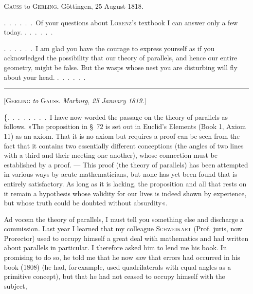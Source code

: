 \clearpage{}
\begin{center}\textsc{Gauss} to \textsc{Gerling}. Göttingen, 25 August 1818.\end{center}

.\ .\ .\ .\ .\ .\ Of your questions about \textsc{Lorenz}'s textbook I can
answer only a few today. .\ .\ .\ .\ .\ .

.\ .\ .\ .\ .\ .\ I am glad you have the courage to express yourself as
if you acknowledged the possibility that our theory of parallels, and hence our entire
geometry, might be false. But the wasps whose nest you
are disturbing will fly about your head. .\ .\ .\ .\ .\ .

\begin{center}\rule{3cm}{0.4pt}\end{center}

\begin{center}[\textsc{Gerling} \emph{to} \textsc{Gauss}. \emph{Marburg, 25 January 1819.}]\end{center}

\{.\ .\ .\ .\ .\ .\ .\ .\ I have now worded the passage on the theory of parallels as follows.
»The proposition in \S\ 72 is set out in Euclid's Elements (Book 1, Axiom 11) as an
axiom. That it is no axiom but requires a
proof can be seen from the fact that it contains two essentially different
conceptions (the angles of two lines with a third and their meeting
one another), whose  connection must be established by
a proof. --- This proof (the
theory of parallels) has been attempted in various ways by acute
mathematicians, but none has yet been found that is entirely
satisfactory. As long as it is lacking, the proposition and all that
rests on it remain a hypothesis whose validity for our lives is indeed
shown by experience, but whose 
truth could be doubted without absurdity«.

Ad vocem the theory of parallels, I must tell you something else and discharge a
commission. Last year I learned that my colleague
\textsc{Schweikart} (Prof. juris, now Prorector) used to occupy himself a great deal with
mathematics and had written about parallels in particular.
I therefore asked him to lend me his book. In promising to do so,
he told me that he now saw that errors had occurred in his book
(1808) (he had, for\,example, used quadrilaterals with equal angles as
a primitive concept), but that he had not ceased
to occupy himself with the subject,
